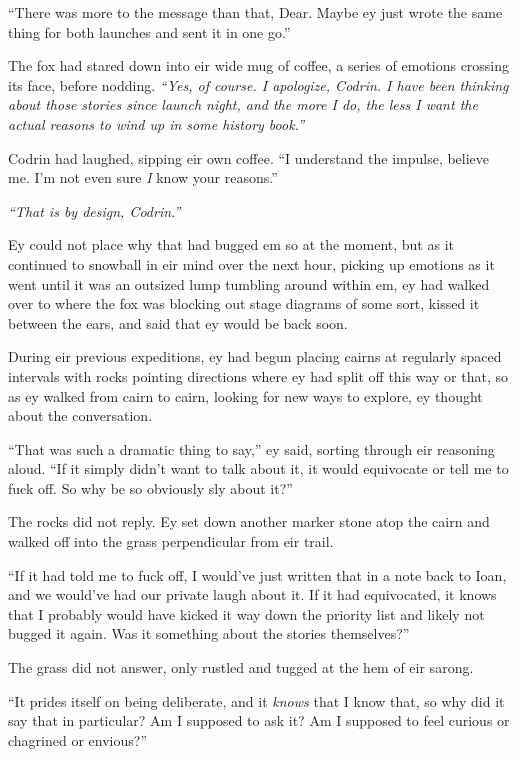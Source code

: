 ``There was more to the message than that, Dear. Maybe ey just wrote the same thing for both launches and sent it in one go.''

The fox had stared down into eir wide mug of coffee, a series of emotions crossing its face, before nodding. \emph{``Yes, of course. I apologize, Codrin. I have been thinking about those stories since launch night, and the more I do, the less I want the actual reasons to wind up in some history book.''}

Codrin had laughed, sipping eir own coffee. ``I understand the impulse, believe me. I'm not even sure \emph{I} know your reasons.''

\emph{``That is by design, Codrin.''}

Ey could not place why that had bugged em so at the moment, but as it continued to snowball in eir mind over the next hour, picking up emotions as it went until it was an outsized lump tumbling around within em, ey had walked over to where the fox was blocking out stage diagrams of some sort, kissed it between the ears, and said that ey would be back soon.

During eir previous expeditions, ey had begun placing cairns at regularly spaced intervals with rocks pointing directions where ey had split off this way or that, so as ey walked from cairn to cairn, looking for new ways to explore, ey thought about the conversation.

``That was such a dramatic thing to say,'' ey said, sorting through eir reasoning aloud. ``If it simply didn't want to talk about it, it would equivocate or tell me to fuck off. So why be so obviously sly about it?''

The rocks did not reply. Ey set down another marker stone atop the cairn and walked off into the grass perpendicular from eir trail.

``If it had told me to fuck off, I would've just written that in a note back to Ioan, and we would've had our private laugh about it. If it had equivocated, it knows that I probably would have kicked it way down the priority list and likely not bugged it again. Was it something about the stories themselves?''

The grass did not answer, only rustled and tugged at the hem of eir sarong.

``It prides itself on being deliberate, and it \emph{knows} that I know that, so why did it say that in particular? Am I supposed to ask it? Am I supposed to feel curious or chagrined or envious?''

